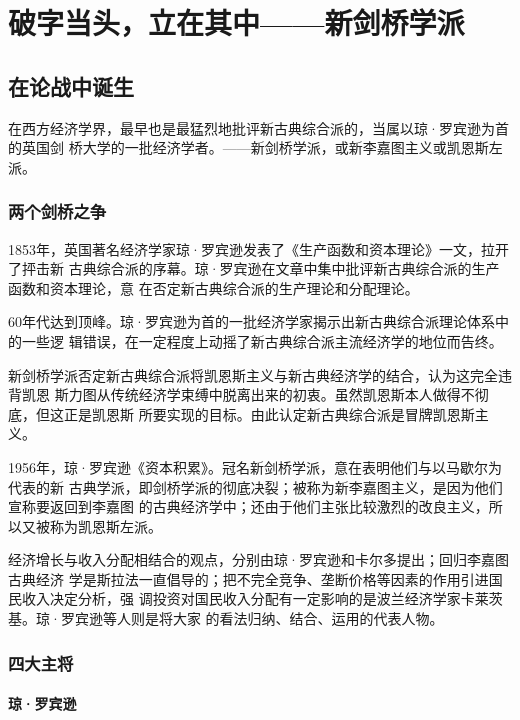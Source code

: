 \chapter{破字当头，立在其中——新剑桥学派}

\section{在论战中诞生}

在西方经济学界，最早也是最猛烈地批评新古典综合派的，当属以琼·罗宾逊为首的英国剑
桥大学的一批经济学者。——新剑桥学派，或新李嘉图主义或凯恩斯左派。

\subsection{两个剑桥之争}

1853年，英国著名经济学家琼·罗宾逊发表了《生产函数和资本理论》一文，拉开了抨击新
古典综合派的序幕。琼·罗宾逊在文章中集中批评新古典综合派的生产函数和资本理论，意
在否定新古典综合派的生产理论和分配理论。

60年代达到顶峰。琼·罗宾逊为首的一批经济学家揭示出新古典综合派理论体系中的一些逻
辑错误，在一定程度上动摇了新古典综合派主流经济学的地位而告终。

新剑桥学派否定新古典综合派将凯恩斯主义与新古典经济学的结合，认为这完全违背凯恩
斯力图从传统经济学束缚中脱离出来的初衷。虽然凯恩斯本人做得不彻底，但这正是凯恩斯
所要实现的目标。由此认定新古典综合派是冒牌凯恩斯主义。

1956年，琼·罗宾逊《资本积累》。冠名新剑桥学派，意在表明他们与以马歇尔为代表的新
古典学派，即剑桥学派的彻底决裂；被称为新李嘉图主义，是因为他们宣称要返回到李嘉图
的古典经济学中；还由于他们主张比较激烈的改良主义，所以又被称为凯恩斯左派。

经济增长与收入分配相结合的观点，分别由琼·罗宾逊和卡尔多提出；回归李嘉图古典经济
学是斯拉法一直倡导的；把不完全竞争、垄断价格等因素的作用引进国民收入决定分析，强
调投资对国民收入分配有一定影响的是波兰经济学家卡莱茨基。琼·罗宾逊等人则是将大家
的看法归纳、结合、运用的代表人物。

\subsection{四大主将}

\subsubsection{琼·罗宾逊}

